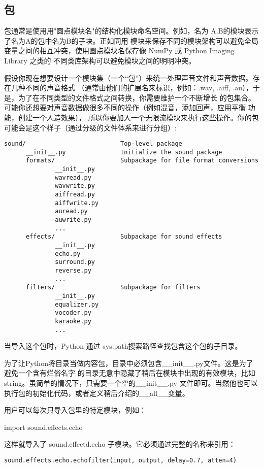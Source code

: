 \documentclass[UTF8]{ctexart}
\begin{document}
\subsection{包}
包通常是使用用"圆点模块名"的结构化模块命名空间。例如，名为 A.B的模块表示了名为A的包中名为B的子块。正如同用
模块来保存不同的模块架构可以避免全局变量之间的相互冲突，使用圆点模块名保存像 NumPy 或 Python Imaging Library
之类的 不同类库架构可以避免模块之间的明明冲突。

假设你现在想要设计一个模块集（一个``包''）来统一处理声音文件和声音数据。存在几种不同的声音格式
（通常由他们的扩展名来标识，例如：.wav, .aiff, .au），于是，为了在不同类型的文件格式之间转换，你需要维护一个不断增长
的包集合。可能你还想要对声音数据做很多不同的操作（例如混音，添加回声，应用平衡 功能，创建一个人造效果），
所以你要加入一个无限流模块来执行这些操作。你的包可能会是这个样子（通过分级的文件体系来进行分组）:
\begin{verbatim}
sound/                          Top-level package
      __init__.py               Initialize the sound package
      formats/                  Subpackage for file format conversions
              __init__.py
              wavread.py
              wavwrite.py
              aiffread.py
              aiffwrite.py
              auread.py
              auwrite.py
              ...
      effects/                  Subpackage for sound effects
              __init__.py
              echo.py
              surround.py
              reverse.py
              ...
      filters/                  Subpackage for filters
              __init__.py
              equalizer.py
              vocoder.py
              karaoke.py
              ...
\end{verbatim}

当导入这个包时，Python 通过 sys.path搜索路径查找包含这个包的子目录。

为了让Python将目录当做内容包，目录中必须包含\_\_init\_\_.py文件。这是为了避免一个含有烂俗名字
的目录无意中隐藏了稍后在模块中出现的有效模块，比如string。虽简单的情况下，只需要一个空的\_\_init\_\_.py
文件即可。当然他也可以执行包的初始化代码，或者定义稍后介绍的\_\_all\_\_变量。

用户可以每次只导入包里的特定模块，例如：

import sound.effects.echo


这样就导入了 sound.effectd.echo 子模块。它必须通过完整的名称来引用：
\begin{verbatim}
sound.effects.echo.echofilter(input, output, delay=0.7, atten=4)
\end{verbatim}
\end{document}
